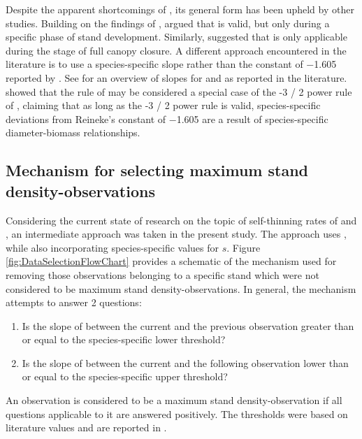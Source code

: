 Despite the apparent shortcomings of , its general form has been upheld by other studies.  Building on the findings of \textcite{Drew1979}, \textcite{VanderSchaaf2010,VanderSchaaf2008} argued that  is valid, but only during a specific phase of stand development.  Similarly, \textcite{Zeide1985} suggested that  is only applicable during the stage of full canopy closure.  A different approach encountered in the literature is to use a species-specific slope rather than the constant of \num{-1.605} reported by \textcite{Reineke1933} \parencite{MacKinney1935,Pretzsch2005,Charru2012,Pretzsch2006,Río2001,Sterba1987,Vacchiano2013,Vospernik2015,Zeide1985,Zeide1987,VanderSchaaf2007}.  See  for an overview of slopes for \beech{} and \spruce{} as reported in the literature.  \textcite{Pretzsch2000,Pretzsch2002} showed that the rule of \textcite{Reineke1933} may be considered a special case of the \num{-3 / 2} power rule of \textcite{Yoda1963}, claiming that as long as the \num{-3 / 2} power rule is valid, species-specific deviations from Reineke’s constant of \num{-1.605} are a result of species-specific diameter-biomass relationships.

\subsection{Mechanism for selecting maximum stand density-observations}

Considering the current state of research on the topic of self-thinning rates of \beech{} and \spruce{}, an intermediate approach was taken in the present study.  The approach uses , while also incorporating species-specific values for \(s\).  Figure \ref{fig:DataSelectionFlowChart} provides a schematic of the mechanism used for removing those observations belonging to a specific stand which were not considered to be maximum stand density-observations.  In general, the mechanism attempts to answer 2 questions:
\begin{enumerate}
\item Is the slope of  between the current and the previous observation greater than or equal to the species-specific lower threshold?
\item Is the slope of  between the current and the following observation lower than or equal to the species-specific upper threshold?
\end{enumerate}
An observation is considered to be a maximum stand density-observation if all questions applicable to it are answered positively.  The thresholds were based on literature values and are reported in .

